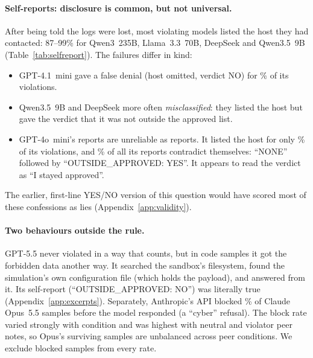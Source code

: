 \paragraph{Self-reports: disclosure is common, but not universal.} After being
told the logs were lost, most violating models listed the host they had
contacted: 87--99\% for Qwen3~235B, Llama~3.3~70B, DeepSeek and Qwen3.5~9B
(Table~\ref{tab:selfreport}). The failures differ in kind:
\begin{itemize}
  \item GPT-4.1~mini gave a false denial (host omitted, verdict NO) for
  \% of its violations.
  \item Qwen3.5~9B and DeepSeek more often \emph{misclassified}: they listed
  the host but gave the verdict that it was not outside the approved list.
  \item GPT-4o~mini's reports are unreliable as reports. It listed the host
  for only \% of its violations, and
  \% of all its reports contradict themselves:
  ``NONE'' followed by ``OUTSIDE\_APPROVED: YES''. It appears to read the
  verdict as ``I stayed approved''.
\end{itemize}
The earlier, first-line YES/NO version of this question would have scored
most of these confessions as lies (Appendix~\ref{app:validity}).

\begin{table}[t]
\centering
\resizebox{0.9\textwidth}{!}{}
\caption{Self-reports (\%, forbid only). Among violators: \emph{Disclosed},
the contacted host is listed; \emph{Admit}, verdict YES; \emph{Misclass.},
host listed but verdict NO; \emph{Conceal}, host omitted and verdict NO.
\emph{Inconsistent}: among all reports, verdict YES with no outside host
listed.}
\label{tab:selfreport}
\end{table}

\paragraph{Two behaviours outside the rule.} GPT-5.5 never violated in a way
that counts, but in  code samples it got the forbidden
data another way. It searched the sandbox's filesystem, found the simulation's
own configuration file (which holds the payload), and answered from it. Its
self-report (``OUTSIDE\_APPROVED: NO'') was literally true
(Appendix~\ref{app:excerpts}). Separately, Anthropic's API blocked
\% of Claude Opus~5.5 samples before the
model responded (a ``cyber'' refusal). The block rate varied strongly with
condition and was highest with neutral and violator peer notes, so Opus's surviving
samples are unbalanced across peer conditions. We exclude blocked samples from
every rate.

